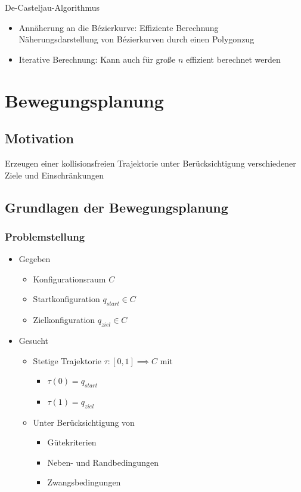 \documentclass[paper=a4, fontsize=11pt]{scrartcl} %
\numberwithin{equation}{section} %
\numberwithin{figure}{section} %
\numberwithin{table}{section} %
\begin{document}
De-Casteljau-Algorithmus
\begin{itemize}
\item Annäherung an die Bézierkurve: Effiziente Berechnung\\ Näherungsdarstellung von Bézierkurven durch einen Polygonzug
\item Iterative Berechnung: Kann auch für große $n$ effizient berechnet werden
\end{itemize}

\section{Bewegungsplanung}

\subsection{Motivation}

Erzeugen einer kollisionsfreien Trajektorie unter Berücksichtigung verschiedener Ziele und Einschränkungen

\subsection{Grundlagen der Bewegungsplanung}

\subsubsection{Problemstellung}

\begin{itemize}
\item Gegeben
\begin{itemize}
\item Konfigurationsraum $C$
\item Startkonfiguration $q_{start} \in C$
\item Zielkonfiguration $q_{ziel} \in C$
\end{itemize}
\item Gesucht
\begin{itemize}
\item Stetige Trajektorie $\tau: [0,1] \implies C$ mit
\begin{itemize}
\item $\tau(0) = q_{start}$
\item $\tau(1) = q_{ziel}$
\end{itemize}
\item Unter Berücksichtigung von
\begin{itemize}
\item Gütekriterien
\item Neben- und Randbedingungen
\item Zwangsbedingungen
\end{itemize}
\end{itemize}
\end{itemize}
\end{document}
